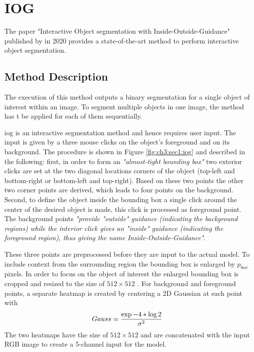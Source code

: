 
\section{IOG}\label{ord:ch3:sec4}

The paper "Interactive Object segmentation with Inside-Outside-Guidance"\cite{Zha20-IOG} published by \citeauthor{Zha20-IOG} \etal in 2020 provides a state-of-the-art method to perform interactive object segmentation.

\subsection{Method Description}\label{ord:ch3:sec4:subsec1}
The execution of this method outputs a binary segmentation for a single object of interest within an image. 
To segment multiple objects in one image, the method has t be applied for each of them sequentially.

\gls{iog} is an interactive segmentation method and hence requires user input. 
The input is given by a three mouse clicks on the object's foreground and on its background.
The procedure is shown in Figure \ref{fig:ch3:sec1:iog} and described in the following:
first, in order to form an \emph{"almost-tight bounding box"}\cite[p. 12235]{Zha20-IOG} two exterior clicks are set at the two diagonal locations corners of the object (top-left and bottom-right or bottom-left and top-right).
Based on these two points the other two corner points are derived, which leads to four points on the background. 
Second, to define the object inside the bounding box a single click around the center of the desired object is made, this click is processed as foreground point. 
The background points \emph{"provide "outside" guidance (indicating the background regions) while the interior click gives an "inside" guidance (indicating the foreground region), thus giving the name \textit{Inside-Outside-Guidance}"}\cite[p. 12235]{Zha20-IOG}.

These three points are preprocessed before they are input to the actual model. To include context from the surrounding region the bounding box is enlarged by $p_{{box}}$ pixels. 
In order to focus on the object of interest the enlarged bounding box is cropped and resized to the size of $512 \times 512$ . 
For background and foreground points, a separate heatmap is created by centering a 2D Gaussian at each point with
\begin{equation} \label{equ:gauss}
	\centering
	Gauss = \frac{\exp{-4 * \log 2 }}{\sigma^{2}}
\end{equation}
The two heatmaps have the size of $512 \times 512$  and are concatenated with the input RGB image to create a 5-channel input for the model. 

